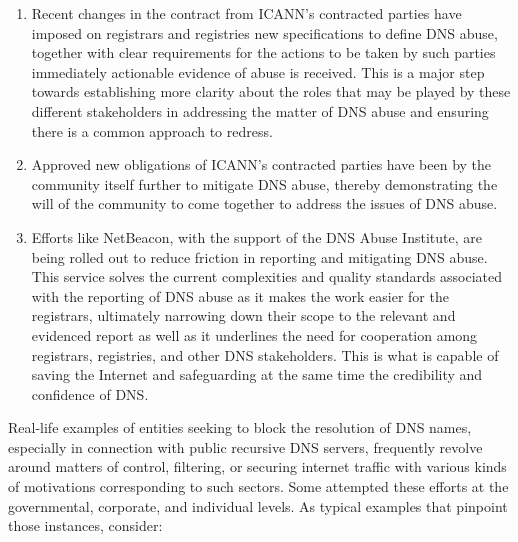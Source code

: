 \begin{enumerate}
  \item Recent changes in the contract from ICANN's contracted parties have imposed on registrars and registries new specifications to define DNS abuse, together with clear requirements for the actions to be taken by such parties immediately actionable evidence of abuse is received. This is a major step towards establishing more clarity about the roles that may be played by these different stakeholders in addressing the matter of DNS abuse and ensuring there is a common approach to redress. \cite{Weinstein2023}
  \item Approved new obligations of ICANN's contracted parties have been by the community itself further to mitigate DNS abuse, thereby demonstrating the will of the community to come together to address the issues of DNS abuse. \cite{ICANN2023}
  \item Efforts like NetBeacon, with the support of the DNS Abuse Institute, are being rolled out to reduce friction in reporting and mitigating DNS abuse. This service solves the current complexities and quality standards associated with the reporting of DNS abuse as it makes the work easier for the registrars, ultimately narrowing down their scope to the relevant and evidenced report as well as it underlines the need for cooperation among registrars, registries, and other DNS stakeholders. This is what is capable of saving the Internet and safeguarding at the same time the credibility and confidence of DNS. \cite{NetBeacon}
  
\end{enumerate}

Real-life examples of entities seeking to block the resolution of DNS names, especially in connection with public recursive DNS servers, frequently revolve around matters of control, filtering, or securing internet traffic with various kinds of motivations corresponding to such sectors. Some attempted these efforts at the governmental, corporate, and individual levels. As typical examples that pinpoint those instances, consider:

